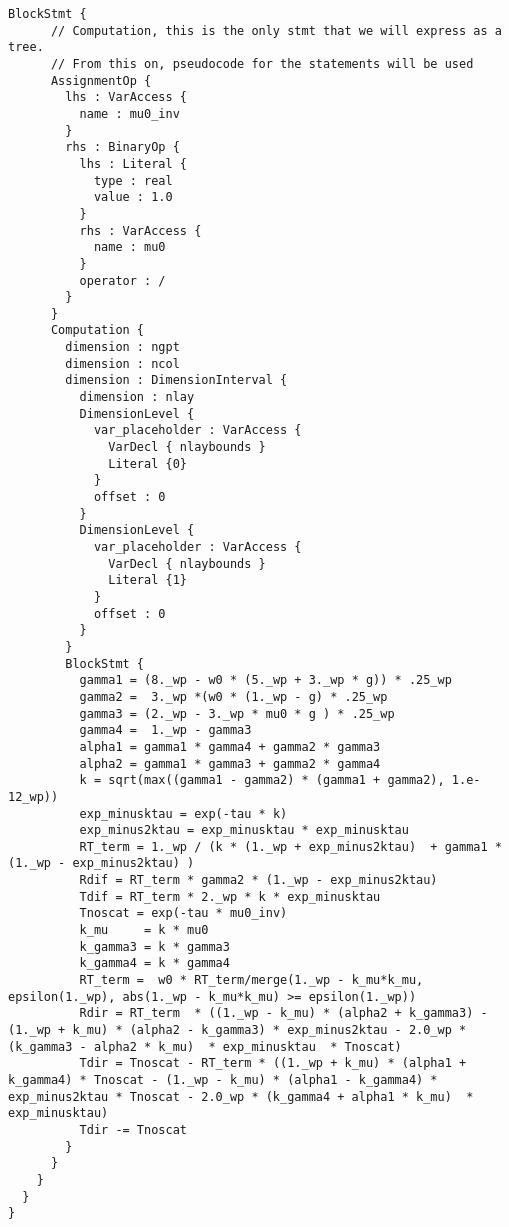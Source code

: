 \begin{lstlisting}[style=default]
    BlockStmt {
      // Computation, this is the only stmt that we will express as a tree. 
      // From this on, pseudocode for the statements will be used
      AssignmentOp {
        lhs : VarAccess {
          name : mu0_inv
        }
        rhs : BinaryOp {
          lhs : Literal {
            type : real
            value : 1.0
          }
          rhs : VarAccess {
            name : mu0
          }
          operator : /
        }
      }
      Computation {
        dimension : ngpt
        dimension : ncol
        dimension : DimensionInterval {
          dimension : nlay
          DimensionLevel {
            var_placeholder : VarAccess { 
              VarDecl { nlaybounds }
              Literal {0}
            }
            offset : 0
          }
          DimensionLevel {
            var_placeholder : VarAccess { 
              VarDecl { nlaybounds }
              Literal {1}
            }
            offset : 0
          }
        }
        BlockStmt {
          gamma1 = (8._wp - w0 * (5._wp + 3._wp * g)) * .25_wp
          gamma2 =  3._wp *(w0 * (1._wp - g) * .25_wp
          gamma3 = (2._wp - 3._wp * mu0 * g ) * .25_wp
          gamma4 =  1._wp - gamma3
          alpha1 = gamma1 * gamma4 + gamma2 * gamma3 
          alpha2 = gamma1 * gamma3 + gamma2 * gamma4 
          k = sqrt(max((gamma1 - gamma2) * (gamma1 + gamma2), 1.e-12_wp))
          exp_minusktau = exp(-tau * k)
          exp_minus2ktau = exp_minusktau * exp_minusktau
          RT_term = 1._wp / (k * (1._wp + exp_minus2ktau)  + gamma1 * (1._wp - exp_minus2ktau) )
          Rdif = RT_term * gamma2 * (1._wp - exp_minus2ktau)
          Tdif = RT_term * 2._wp * k * exp_minusktau
          Tnoscat = exp(-tau * mu0_inv)
          k_mu     = k * mu0
          k_gamma3 = k * gamma3
          k_gamma4 = k * gamma4
          RT_term =  w0 * RT_term/merge(1._wp - k_mu*k_mu, epsilon(1._wp), abs(1._wp - k_mu*k_mu) >= epsilon(1._wp))
          Rdir = RT_term  * ((1._wp - k_mu) * (alpha2 + k_gamma3) -  (1._wp + k_mu) * (alpha2 - k_gamma3) * exp_minus2ktau - 2.0_wp * (k_gamma3 - alpha2 * k_mu)  * exp_minusktau  * Tnoscat)
          Tdir = Tnoscat - RT_term * ((1._wp + k_mu) * (alpha1 + k_gamma4) * Tnoscat - (1._wp - k_mu) * (alpha1 - k_gamma4) * exp_minus2ktau * Tnoscat - 2.0_wp * (k_gamma4 + alpha1 * k_mu)  * exp_minusktau)
          Tdir -= Tnoscat
        }   
      }
    }
  }
}
\end{lstlisting}
